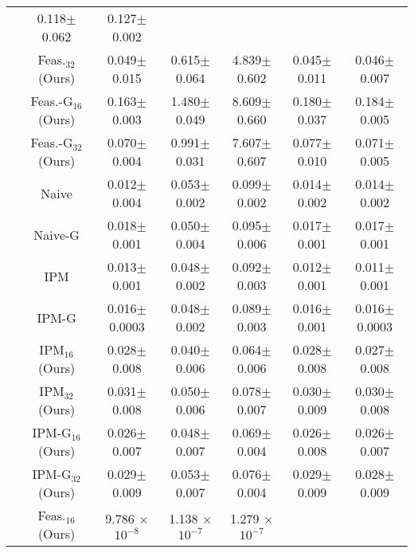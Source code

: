 \begin{table*}[t]
{\begin{tabular}{ccccccc}
& 0.118\scriptsize$\pm$0.062 & 0.127\scriptsize$\pm$0.002 \\
& Feas.$_{32}$ (Ours) & 0.049\scriptsize$\pm$0.015 & 0.615\scriptsize$\pm$0.064 & 4.839\scriptsize$\pm$0.602
& 0.045\scriptsize$\pm$0.011 & 0.046\scriptsize$\pm$0.007 \\
& Feas.-G$_{16}$ (Ours) & 0.163\scriptsize$\pm$0.003 & 1.480\scriptsize$\pm$0.049 & 8.609\scriptsize$\pm$0.660
& 0.180\scriptsize$\pm$0.037 & 0.184\scriptsize$\pm$0.005 \\
& Feas.-G$_{32}$ (Ours) & 0.070\scriptsize$\pm$0.004 & 0.991\scriptsize$\pm$0.031 & 7.607\scriptsize$\pm$0.607
& 0.077\scriptsize$\pm$0.010 & 0.071\scriptsize$\pm$0.005 \\
\midrule

{\multirow{12}{*}{Cons. vio.}}
& Naive \citeyear{chen2024qp} & 0.012\scriptsize$\pm$0.004 & 0.053\scriptsize$\pm$0.002 & 0.099\scriptsize$\pm$0.002
& 0.014\scriptsize$\pm$0.002 & 0.014\scriptsize$\pm$0.002  \\
& Naive-G \citeyear{chen2024qp} & 0.018\scriptsize$\pm$0.001 & 0.050\scriptsize$\pm$0.004 & 0.095\scriptsize$\pm$0.006
& 0.017\scriptsize$\pm$0.001 & 0.017\scriptsize$\pm$0.001 \\
\cmidrule{2-7}
& IPM \citeyear{pmlr-v238-qian24a} & 0.013\scriptsize$\pm$0.001 & 0.048\scriptsize$\pm$0.002 & 0.092\scriptsize$\pm$0.003
& 0.012\scriptsize$\pm$0.001 & 0.011\scriptsize$\pm$0.001 \\
& IPM-G \citeyear{pmlr-v238-qian24a} & 0.016\scriptsize$\pm$0.0003 & 0.048\scriptsize$\pm$0.002 & 0.089\scriptsize$\pm$0.003
& 0.016\scriptsize$\pm$0.001 & 0.016\scriptsize$\pm$0.0003\\
\cmidrule{2-7}
& IPM$_{16}$ (Ours) & 0.028\scriptsize$\pm$0.008 & 0.040\scriptsize$\pm$0.006 & 0.064\scriptsize$\pm$0.006
& 0.028\scriptsize$\pm$0.008 & 0.027\scriptsize$\pm$0.008\\
& IPM$_{32}$ (Ours) & 0.031\scriptsize$\pm$0.008 & 0.050\scriptsize$\pm$0.006 & 0.078\scriptsize$\pm$0.007
& 0.030\scriptsize$\pm$0.009 & 0.030\scriptsize$\pm$0.008\\
& IPM-G$_{16}$ (Ours) & 0.026\scriptsize$\pm$0.007 & 0.048\scriptsize$\pm$0.007 & 0.069\scriptsize$\pm$0.004
& 0.026\scriptsize$\pm$0.008 & 0.026\scriptsize$\pm$0.007 \\
& IPM-G$_{32}$ (Ours) & 0.029\scriptsize$\pm$0.009 & 0.053\scriptsize$\pm$0.007 & 0.076\scriptsize$\pm$0.004
& 0.029\scriptsize$\pm$0.009 & 0.028\scriptsize$\pm$0.009 \\
\cmidrule{2-7}
& Feas.$_{16}$ (Ours) & 9.786  \(\times\) \(10^{-8}\) & 1.138  \(\times\) \(10^{-7}\) & 1.279  \(\times\) \(10^{-7}\)

\end{tabular}}
\end{table*}
